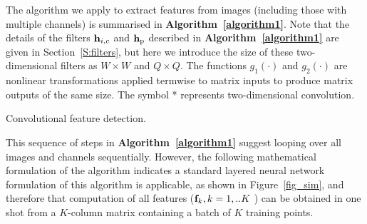 \documentclass[conference]{IEEEtran}
\begin{document}
The algorithm we apply to extract features from images (including those with multiple channels) is summarised in {\bf Algorithm~\ref{algorithm1}}. Note that the details of the filters ${\bf h}_{i,c}$ and ${\bf h}_{\rm p}$ described in  {\bf Algorithm~\ref{algorithm1}} are given in Section~\ref{S:filters}, but here we introduce the size of these two-dimensional filters as $W\times W$ and $Q\times Q$. The functions $g_1(\cdot)$ and $g_2(\cdot)$ are nonlinear transformations applied termwise to matrix inputs to produce matrix outputs of the same size. The symbol * represents two-dimensional convolution.


\begin{algorithm}
\caption{Convolutional feature detection.}
\BlankLine
{}
\label{algorithm1}
\end{algorithm}


This sequence of steps in  {\bf Algorithm~\ref{algorithm1}} suggest looping over all images and channels sequentially. However, the following mathematical formulation of the  algorithm indicates a standard layered neural network formulation of this algorithm is applicable, as shown in Figure~\ref{fig_sim}, and therefore that computation of all features (${\bf f}_{k},k=1,..K$ ) can be obtained in one shot from a $K$-column matrix containing a batch of $K$ training points.
\end{document}
